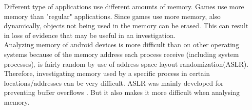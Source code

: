 Different type of applications use different amounts of memory. Games use more memory than "regular" applications.
Since games use more memory, also dynamically, objects not being used in the memory can be erased. This can result in
loss of evidence that may be useful in an investigation.\\

Analyzing memory of android devices is more difficult than on other operating systems because of the memory address 
each process receive (including system processes), is fairly random by use of address space layout randomization(ASLR). 
Therefore, investigating memory used by a specific process in certain locations/addresses can be very difficult.
ASLR was mainly developed for preventing buffer overflows \cite{prot_aslr}. But it also makes it more difficult when 
analysing memory.\\





%
%

